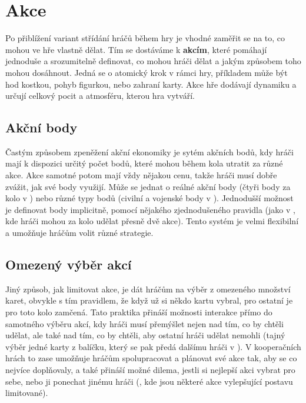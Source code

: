 
\section{Akce}
\label{sec:actions}

Po přiblížení variant střídání hráčů během hry je vhodné zaměřit se na to, co mohou ve hře vlastně dělat. Tím se dostáváme k \textbf{akcím}, které pomáhají jednoduše a srozumitelně definovat, co mohou hráči dělat a jakým způsobem toho mohou dosáhnout. Jedná se o atomický krok v rámci hry, příkladem může být hod kostkou, pohyb figurkou, nebo zahraní karty. Akce hře dodávají dynamiku a určují celkový pocit a atmosféru, kterou hra vytváří.

\subsection{Akční body}
\label{subsec:actions_action_points}

Častým způsobem zpeněžení akční ekonomiky je sytém akčních bodů, kdy hráči mají k dispozici určitý počet bodů, které mohou během kola utratit za různé akce. Akce samotné potom mají vždy nějakou cenu, takže hráči musí dobře zvážit, jak své body využijí. Může se jednat o reálné akční body (čtyři body za kolo v ) nebo různé typy bodů (civilní a vojenské body v ). Jednodušší možnost je definovat body implicitně, pomocí nějakého zjednodušeného pravidla (jako v , kde hráči mohou za kolo udělat přesně dvě akce). Tento systém je velmi flexibilní a umožňuje hráčům volit různé strategie.

\subsection{Omezený výběr akcí}
\label{subsec:actions_limited_actions}

Jiný způsob, jak limitovat akce, je dát hráčům na výběr z omezeného množství karet, obvykle s tím pravidlem, že když už si někdo kartu vybral, pro ostatní je pro toto kolo zamčená. Tato praktika přináší možnosti interakce přímo do samotného výběru akcí, kdy hráči musí přemýšlet nejen nad tím, co by chtěli udělat, ale také nad tím, co by chtěli, aby ostatní hráči udělat nemohli (tajný výběr jedné karty z balíčku, který se pak předá dalšímu hráči v ). V kooperačních hrách to zase umožňuje hráčům spolupracovat a plánovat své akce tak, aby se co nejvíce doplňovaly, a také přináší možné dilema, jestli si nejlepší akci vybrat pro sebe, nebo ji ponechat jinému hráči (, kde jsou některé akce vylepšující postavu limitované).

